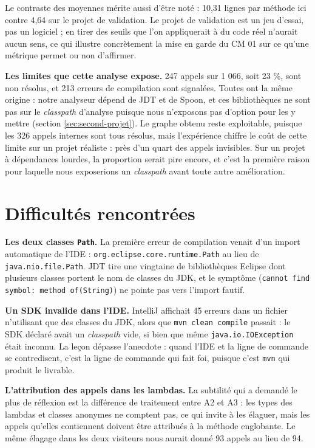 \documentclass[11pt,a4paper]{article}
\begin{document}
Le contraste des moyennes mérite aussi d'être noté : 10,31 lignes par méthode ici contre 4,64 sur le projet de validation. Le projet de validation est un jeu d'essai, pas un logiciel ; en tirer des seuils que l'on appliquerait à du code réel n'aurait aucun sens, ce qui illustre concrètement la mise en garde du CM 01 sur ce qu'une métrique permet ou non d'affirmer.

\textbf{Les limites que cette analyse expose.} 247 appels sur 1 066, soit 23 \%, sont non résolus, et 213 erreurs de compilation sont signalées. Toutes ont la même origine : notre analyseur dépend de JDT et de Spoon, et ces bibliothèques ne sont pas sur le \textit{classpath} d'analyse puisque nous n'exposons pas d'option pour les y mettre (section \ref{sec:second-projet}). Le graphe obtenu reste exploitable, puisque les 326 appels internes sont tous résolus, mais l'expérience chiffre le coût de cette limite sur un projet réaliste : près d'un quart des appels invisibles. Sur un projet à dépendances lourdes, la proportion serait pire encore, et c'est la première raison pour laquelle nous exposerions un \textit{classpath} avant toute autre amélioration.

\section{Difficultés rencontrées}

\textbf{Les deux classes \texttt{Path}.} La première erreur de compilation venait d'un import automatique de l'IDE : \texttt{org.eclipse.core.runtime.Path} au lieu de \texttt{java.nio.file.Path}. JDT tire une vingtaine de bibliothèques Eclipse dont plusieurs classes portent le nom de classes du JDK, et le symptôme (\texttt{cannot find symbol: method of(String)}) ne pointe pas vers l'import fautif.

\textbf{Un SDK invalide dans l'IDE.} IntelliJ affichait 45 erreurs dans un fichier n'utilisant que des classes du JDK, alors que \texttt{mvn clean compile} passait : le SDK déclaré avait un \textit{classpath} vide, si bien que même \texttt{java.io.IOException} était inconnu. La leçon dépasse l'anecdote : quand l'IDE et la ligne de commande se contredisent, c'est la ligne de commande qui fait foi, puisque c'est \texttt{mvn} qui produit le livrable.

\textbf{L'attribution des appels dans les lambdas.} La subtilité qui a demandé le plus de réflexion est la différence de traitement entre A2 et A3 : les types des lambdas et classes anonymes ne comptent pas, ce qui invite à les élaguer, mais les appels qu'elles contiennent doivent être attribués à la méthode englobante. Le même élagage dans les deux visiteurs nous aurait donné 93 appels au lieu de 94.
\end{document}
